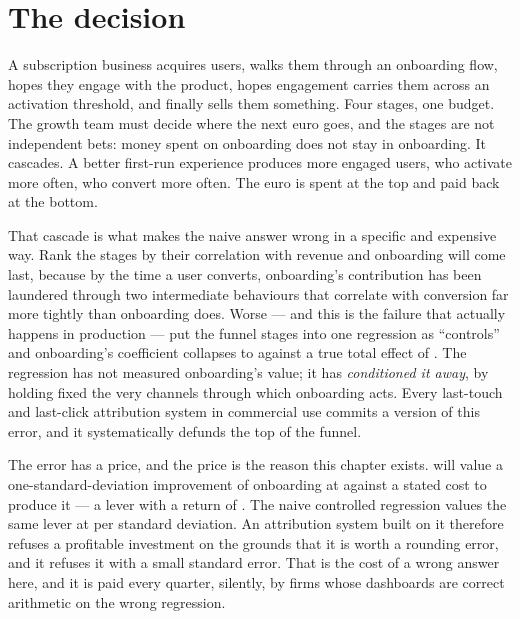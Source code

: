 \section{The decision}
\label{sec:med:decision}

A subscription business acquires users, walks them through an onboarding flow, hopes they engage
with the product, hopes engagement carries them across an activation threshold, and finally sells
them something. Four stages, one budget. The growth team must decide where the next euro goes,
and the stages are not independent bets: money spent on onboarding does not stay in onboarding.
It cascades. A better first-run experience produces more engaged users, who activate more often,
who convert more often. The euro is spent at the top and paid back at the bottom.

That cascade is what makes the naive answer wrong in a specific and expensive way. Rank the
stages by their correlation with revenue and onboarding will come last, because by the time a user
converts, onboarding's contribution has been laundered through two intermediate behaviours that
correlate with conversion far more tightly than onboarding does. Worse --- and this is the failure
that actually happens in production --- put the funnel stages into one regression as
``controls'' and onboarding's coefficient collapses to \nbFourNaiveOnCoef{} against a true total
effect of \nbFourTrueTotal. The regression has not measured onboarding's value; it has
\emph{conditioned it away}, by holding fixed the very channels through which onboarding acts.
Every last-touch and last-click attribution system in commercial use commits a version of this
error, and it systematically defunds the top of the funnel.

The error has a price, and the price is the reason this chapter exists.
 will value a one-standard-deviation improvement of onboarding at
\eur{\nbFourValOnboarding} against a stated \eur{\nbFourCostSd} cost to produce it --- a lever with a
return of \nbFourRoiOnboarding. The naive controlled regression values the same lever at
\eur{\nbFourValOnboardingNaive} per standard deviation. An attribution system built on it therefore
refuses a profitable investment on the grounds that it is worth a rounding error, and it refuses it
with a small standard error. That is the cost of a wrong answer here, and it is paid every
quarter, silently, by firms whose dashboards are correct arithmetic on the wrong regression.

